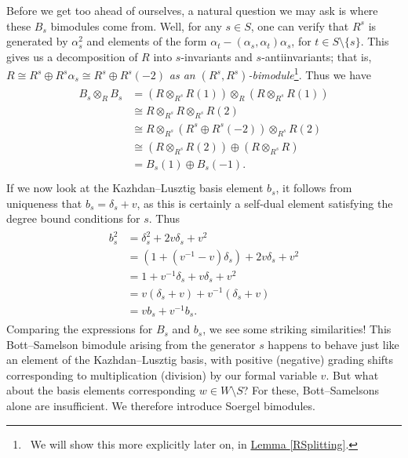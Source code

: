 \noindent Before we get too ahead of ourselves, a natural question we may ask is where these $B_s$ bimodules come from. Well, for any $s \in S$, one can verify that $R^s$ is generated by $\alpha_s^2$ and elements of the form $\alpha_t - (\alpha_s, \alpha_t)\alpha_s$, for $t \in S \setminus \{s\}$. This gives us a decomposition of $R$ into $s$-invariants and $s$-antiinvariants; that is, $R \cong R^s \oplus R^s \alpha_s \cong R^s \oplus R^s(-2)$ {\em as an $(R^s, R^s)$-bimodule}\footnote[2]{\ We will show this more explicitly later on, in \hyperref[RSplitting]{Lemma \ref*{RSplitting}}.}. Thus we have
\begin{align*}
\begin{split}
B_s \otimes_R B_s &= (R \otimes_{R^s} R(1)) \otimes_R (R \otimes_{R^s} R(1))\\
&\cong R \otimes_{R^s} R \otimes_{R^s} R(2)\\
&\cong R \otimes_{R^s} (R^s \oplus R^s(-2)) \otimes_{R^s} R(2)\\
&\cong (R \otimes_{R^s} R(2)) \oplus (R \otimes_{R^s} R)\\
&= B_s(1) \oplus B_s(-1).\\
\end{split}
\end{align*}
\noindent If we now look at the Kazhdan--Lusztig basis element $b_s$, it follows from uniqueness that $b_s = \delta_s + v$, as this is certainly a self-dual element satisfying the degree bound conditions for $s$. Thus
\begin{align*}
\begin{split}
b_s^2 &= \delta_s^2 + 2v\delta_s + v^2\\
&= (1 + (v^{-1} - v)\delta_s) + 2v\delta_s + v^2\\
&= 1 + v^{-1}\delta_s + v\delta_s + v^2\\
&= v(\delta_s + v) + v^{-1}(\delta_s + v)\\
&= vb_s + v^{-1}b_s.
\end{split}
\end{align*}
\noindent Comparing the expressions for $B_s$ and $b_s$, we see some striking similarities! This Bott--Samelson bimodule arising from the generator $s$ happens to behave just like an element of the Kazhdan--Lusztig basis, with positive (negative) grading shifts corresponding to multiplication (division) by our formal variable $v$. But what about the basis elements corresponding $w \in W\setminus S$? For these, Bott--Samelsons alone are insufficient. We therefore introduce Soergel bimodules.\\


